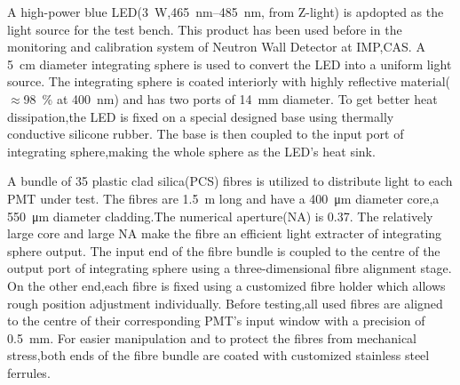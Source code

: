 \documentclass[preprint,5p,times]{elsarticle}
\begin{document}
A high-power blue LED(\SI{3}{\watt},\SIrange{465}{485}{\nano\meter}, from Z-light\cite{zlight}) is apdopted as the light source for the test bench.
This product has been used before in the monitoring and calibration system of Neutron Wall Detector at IMP,CAS\cite{yuyuhong_led}. 
A \SI{5}{\centi\meter} diameter integrating sphere is used to convert the LED into a uniform light source.
The integrating sphere is coated interiorly with highly reflective material($\approx$\SI{98}{\percent} at \SI{400}{\nano\meter}) and has two ports of \SI{14}{\milli\meter} diameter.
To get better heat dissipation,the LED is fixed on a special designed base using thermally conductive silicone rubber.
The base is then coupled to the input port of integrating sphere,making the whole sphere as the LED's heat sink.

A bundle of 35 plastic clad silica(PCS) fibres is utilized to distribute light to each PMT under test.
The fibres are \SI{1.5}{\meter} long and have a \SI{400}{\micro\meter} diameter core,a \SI{550}{\micro\meter} diameter cladding.The numerical aperture(NA) is 0.37.
The relatively large core and large NA make the fibre an efficient light extracter of integrating sphere output. 
The input end of the fibre bundle is coupled to the centre of the output port of integrating sphere using a three-dimensional fibre alignment stage.
On the other end,each fibre is fixed using a customized fibre holder which allows rough position adjustment individually.
Before testing,all used fibres are aligned to the centre of their corresponding PMT's input window with a precision of \SI{0.5}{\milli\meter}.  
For easier manipulation and to protect the fibres from mechanical stress,both ends of the fibre bundle are coated with customized stainless steel ferrules.
\end{document}
